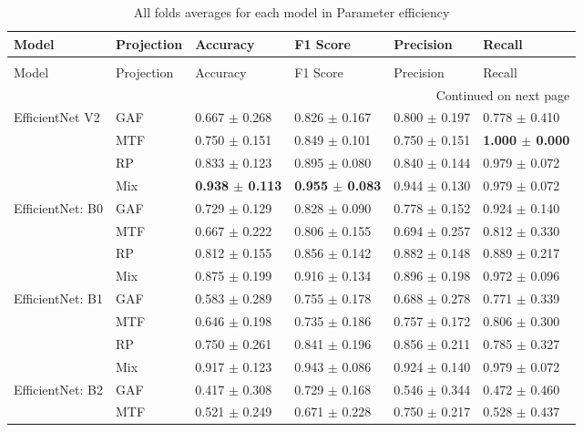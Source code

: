 \begin{longtable}[t]{llllll}
\caption{All folds averages for each model in Parameter efficiency} \\
\toprule
Model & Projection & Accuracy & F1 Score & Precision & Recall \\
\midrule
\endfirsthead
\caption[]{All folds averages for each model in Parameter efficiency} \\
\toprule
Model & Projection & Accuracy & F1 Score & Precision & Recall \\
\midrule
\endhead
\midrule
\multicolumn{6}{r}{Continued on next page} \\
\midrule
\endfoot
\bottomrule
\endlastfoot
EfficientNet V2 & GAF & 0.667 $\pm$ 0.268 & 0.826 $\pm$ 0.167 & 0.800 $\pm$ 0.197 & 0.778 $\pm$ 0.410 \\
 & MTF & 0.750 $\pm$ 0.151 & 0.849 $\pm$ 0.101 & 0.750 $\pm$ 0.151 & \textbf{1.000 $\pm$ 0.000} \\
 & RP & 0.833 $\pm$ 0.123 & 0.895 $\pm$ 0.080 & 0.840 $\pm$ 0.144 & 0.979 $\pm$ 0.072 \\
 & Mix & \textbf{0.938 $\pm$ 0.113} & \textbf{0.955 $\pm$ 0.083} & 0.944 $\pm$ 0.130 & 0.979 $\pm$ 0.072 \\
EfficientNet: B0 & GAF & 0.729 $\pm$ 0.129 & 0.828 $\pm$ 0.090 & 0.778 $\pm$ 0.152 & 0.924 $\pm$ 0.140 \\
 & MTF & 0.667 $\pm$ 0.222 & 0.806 $\pm$ 0.155 & 0.694 $\pm$ 0.257 & 0.812 $\pm$ 0.330 \\
 & RP & 0.812 $\pm$ 0.155 & 0.856 $\pm$ 0.142 & 0.882 $\pm$ 0.148 & 0.889 $\pm$ 0.217 \\
 & Mix & 0.875 $\pm$ 0.199 & 0.916 $\pm$ 0.134 & 0.896 $\pm$ 0.198 & 0.972 $\pm$ 0.096 \\
EfficientNet: B1 & GAF & 0.583 $\pm$ 0.289 & 0.755 $\pm$ 0.178 & 0.688 $\pm$ 0.278 & 0.771 $\pm$ 0.339 \\
 & MTF & 0.646 $\pm$ 0.198 & 0.735 $\pm$ 0.186 & 0.757 $\pm$ 0.172 & 0.806 $\pm$ 0.300 \\
 & RP & 0.750 $\pm$ 0.261 & 0.841 $\pm$ 0.196 & 0.856 $\pm$ 0.211 & 0.785 $\pm$ 0.327 \\
 & Mix & 0.917 $\pm$ 0.123 & 0.943 $\pm$ 0.086 & 0.924 $\pm$ 0.140 & 0.979 $\pm$ 0.072 \\
EfficientNet: B2 & GAF & 0.417 $\pm$ 0.308 & 0.729 $\pm$ 0.168 & 0.546 $\pm$ 0.344 & 0.472 $\pm$ 0.460 \\
 & MTF & 0.521 $\pm$ 0.249 & 0.671 $\pm$ 0.228 & 0.750 $\pm$ 0.217 & 0.528 $\pm$ 0.437 \\

\end{longtable}

